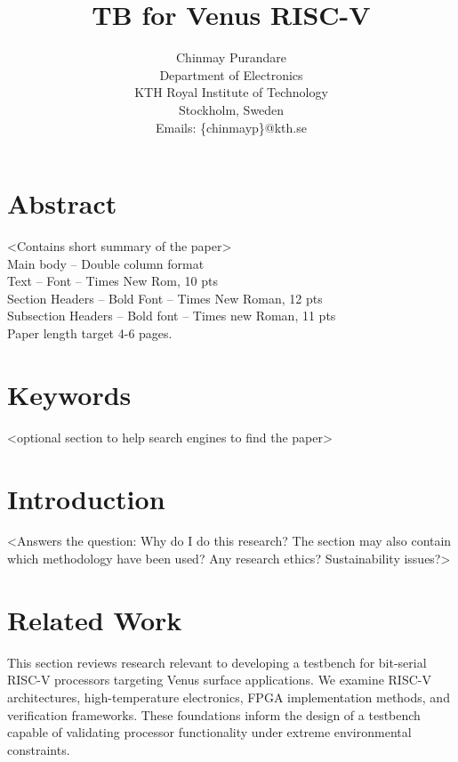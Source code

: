 \documentclass[10pt,twocolumn]{article}
\title{\textbf{TB for Venus RISC-V}\\[0.5em]}
\author{Chinmay Purandare\\
Department of Electronics\\
KTH Royal Institute of Technology\\
Stockholm, Sweden\\
Emails: \{chinmayp\}@kth.se}
\date{}
\begin{document}
\maketitle

\section*{Abstract}
<Contains short summary of the paper>\\
Main body – Double column format\\
Text – Font – Times New Rom, 10 pts\\
Section Headers – Bold Font – Times New Roman, 12 pts\\
Subsection Headers – Bold font – Times new Roman, 11 pts\\
Paper length target 4-6 pages.

\section*{Keywords}
<optional section to help search engines to find the paper>

\section{Introduction}
<Answers the question: Why do I do this research? The section may also contain which methodology have been used? Any research ethics? Sustainability issues?>

\section{Related Work}
This section reviews research relevant to developing a testbench for bit-serial RISC-V processors targeting Venus surface applications. We examine RISC-V architectures, high-temperature electronics, FPGA implementation methods, and verification frameworks. These foundations inform the design of a testbench capable of validating processor functionality under extreme environmental constraints.
\end{document}
